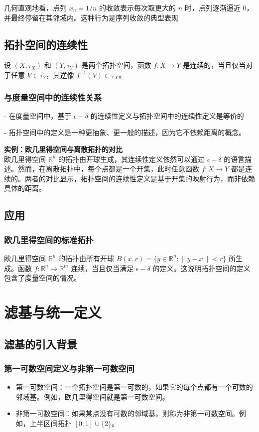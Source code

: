 \documentclass[a4paper, oneside]{article}
\begin{document}
几何直观地看，点列 $x_n = 1/n$ 的收敛表示每次取更大的 $n$ 时，点列逐渐逼近 $0$，并最终停留在其邻域内。这种行为是序列收敛的典型表现

\subsection{拓扑空间的连续性}
设 $(X, \tau_X)$ 和 $(Y, \tau_Y)$ 是两个拓扑空间，函数 $f: X \to Y$ 是连续的，当且仅当对于任意 $V \in \tau_Y$，其逆像 $f^{-1}(V) \in \tau_X$。

\subsubsection{与度量空间中的连续性关系}

- 在度量空间中，基于 $\epsilon-\delta$ 的连续性定义与拓扑空间中的连续性定义是等价的

- 拓扑空间中的定义是一种更抽象、更一般的描述，因为它不依赖距离的概念。

\textbf{实例：欧几里得空间与离散拓扑的对比}\\
欧几里得空间 $\mathbb{R}^n$ 的拓扑由开球生成，其连续性定义依然可以通过 $\epsilon-\delta$ 的语言描述。然而，在离散拓扑中，每个点都是一个开集，此时任意函数 $f: X \to Y$ 都是连续的。两者的对比显示，拓扑空间的连续性定义是基于开集的映射行为，而非依赖具体的距离。

\subsection{应用}
\subsubsection{欧几里得空间的标准拓扑}
欧几里得空间 $\mathbb{R}^n$ 的拓扑由所有开球 $B(x, r) = \{y \in \mathbb{R}^n : \|y - x\| < r\}$ 所生成。函数 $f: \mathbb{R}^n \to \mathbb{R}^m$ 连续，当且仅当满足 $\epsilon-\delta$ 的定义。这说明拓扑空间的定义包含了度量空间的情况。

\section{滤基与统一定义}
\subsection{滤基的引入背景}
\subsubsection{第一可数空间定义与非第一可数空间}
\begin{itemize}
    \item 第一可数空间：一个拓扑空间是第一可数的，如果它的每个点都有一个可数的邻域基。例如，欧几里得空间就是第一可数空间。
    \item 非第一可数空间：如果某点没有可数的邻域基，则称为非第一可数空间。例如，上半区间拓扑 $[0, 1] \cup \{2\}$。
\end{itemize}
\end{document}
